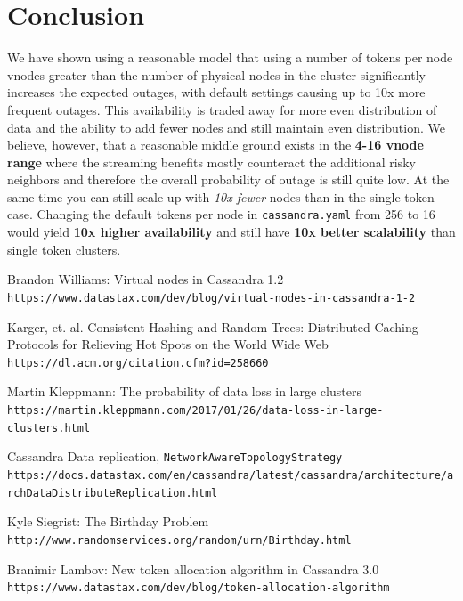 \documentclass{article}
\begin{document}
\section{Conclusion}

We have shown using a reasonable model that using a number of tokens per node
vnodes greater than the number of physical nodes in the cluster significantly
increases the expected outages, with default settings causing up to 10x more
frequent outages. This availability is traded away for more even distribution
of data and the ability to add fewer nodes and still maintain even distribution.
We believe, however, that a reasonable middle ground exists in the
\textbf{4-16 vnode range} where the streaming benefits mostly counteract the
additional risky neighbors and therefore the overall probability of outage is
still quite low. At the same time you can still scale up with
\textit{10x fewer} nodes than in the single token case. Changing the default
tokens per node in \texttt{cassandra.yaml} from 256 to 16 would yield
\textbf{10x higher availability} and still have \textbf{10x better scalability}
than single token clusters.

\begin{thebibliography}{9}

Brandon Williams: Virtual nodes in Cassandra 1.2
\\\texttt{https://www.datastax.com/dev/blog/virtual-nodes-in-cassandra-1-2}

Karger, et. al. Consistent Hashing and Random Trees: Distributed Caching Protocols for Relieving Hot Spots on the World Wide Web
\\\texttt{https://dl.acm.org/citation.cfm?id=258660}

Martin Kleppmann: The probability of data loss in large clusters
\\\texttt{https://martin.kleppmann.com/2017/01/26/data-loss-in-large-clusters.html}

Cassandra Data replication, \texttt{NetworkAwareTopologyStrategy}
\texttt{https://docs.datastax.com/en/cassandra/latest/cassandra/architecture/archDataDistributeReplication.html}

Kyle Siegrist: The Birthday Problem
\\\texttt{http://www.randomservices.org/random/urn/Birthday.html}

Branimir Lambov: New token allocation algorithm in Cassandra 3.0
\\\texttt{https://www.datastax.com/dev/blog/token-allocation-algorithm}



\end{thebibliography}
\end{document}
